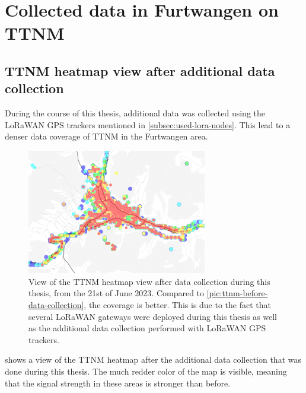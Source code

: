 \section{Collected data in Furtwangen on \acl{TTNM}}\label{sec:collected-data-in-furtwangen-on-ttnm}


\subsection{\acl{TTNM} heatmap view after additional data collection}\label{sec:ttm_heatmap_after}

During the course of this thesis, additional data was collected using the \ac{LoRaWAN} \ac{GPS} trackers mentioned in \cref{subsec:used-lora-nodes}.
This lead to a denser data coverage of \acl{TTNM} in the Furtwangen area.

\begin{figure}[htbp]
    \centering
    \includegraphics[width=0.7\textwidth]{pictures/ttn-mapper/ttnm_heatmap_after_data_collection.jpg}
    \caption{
        View of the \ac{TTNM} heatmap view after data collection during this thesis, from the 21st of June 2023.
        Compared to \cref{pic:ttnm-before-data-collection}, the coverage is better.
        This is due to the fact that several \ac{LoRaWAN} gateways were deployed during this thesis as well as the additional data collection performed with \ac{LoRaWAN} \ac{GPS} trackers.
    }\label{pic:ttnm-heatmap-after-data-collection}
\end{figure}

 shows a view of the \ac{TTNM} heatmap after the additional data collection that was done during this thesis.
The much redder color of the map is visible, meaning that the signal strength in these areas is stronger than before.


